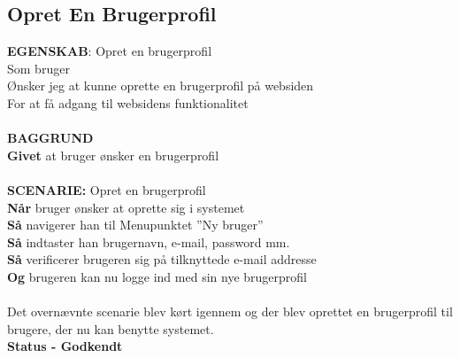 \subsection{Opret En Brugerprofil}
{\color{blue}\textbf{EGENSKAB}:} Opret en brugerprofil \\
Som bruger \\
Ønsker jeg at kunne oprette en brugerprofil på websiden \\
For at få adgang til websidens funktionalitet\\ \\
{\color{blue}\textbf{BAGGRUND}} \\
{\color{blue}\textbf{Givet}} at bruger ønsker en brugerprofil \\\\
{\color{blue}\textbf{SCENARIE:}} Opret en brugerprofil \\
{\color{blue}\textbf{Når}} bruger ønsker at oprette sig i systemet \\
{\color{blue}\textbf{Så}} navigerer han til Menupunktet ”Ny bruger” \\
{\color{blue}\textbf{Så}} indtaster han brugernavn, e-mail, password mm.\\
{\color{blue}\textbf{Så}} verificerer brugeren sig på tilknyttede e-mail addresse\\
{\color{blue}\textbf{Og}} brugeren kan nu logge ind med sin nye brugerprofil \\ \\
Det overnævnte scenarie blev kørt igennem og der blev oprettet en brugerprofil til brugere, der nu kan benytte systemet.  \\
\textbf{Status - Godkendt}

